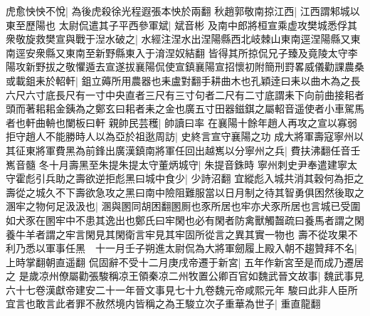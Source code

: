 虎愈怏怏不悅|{
	為後虎殺徐光程遐張本怏於兩翻}
秋趙郭敬南掠江西|{
	江西謂邾城以東至歷陽也}
太尉侃遣其子平西參軍斌|{
	斌音彬}
及南中郎將桓宣乘虚攻樊城悉俘其衆敬旋救樊宣與戰于湼水破之|{
	水經注涅水出涅陽縣西北岐棘山東南逕涅陽縣又東南逕安衆縣又東南至新野縣東入于淯涅奴結翻}
皆得其所掠侃兄子臻及竟陵太守李陽攻新野拔之敬懼遁去宣遂拔襄陽侃使宣鎮襄陽宣招懷初附簡刑罸畧威儀勸課農桑或載鉏耒於軺軒|{
	鉏立薅所用農器也耒盧對翻手耕曲木也孔穎逹曰耒以曲木為之長六尺六寸底長尺有一寸中央直者三尺有三寸句者二尺有二寸底謂耒下向前曲接耜者頭而著耜耜金銕為之鄭玄曰耜者耒之金也廣五寸田器鎡錤之屬軺音遥使者小車駕馬者也軒曲輈也闌板曰軒}
親帥民芸穫|{
	帥讀曰率}
在襄陽十餘年趙人再攻之宣以寡弱拒守趙人不能勝時人以為亞於祖逖周訪|{
	史終言宣守襄陽之功}
成大將軍壽寇寧州以其征東將軍費黑為前鋒出廣漢鎮南將軍任回出越嶲以分寧州之兵|{
	費扶沸翻任音壬嶲音髓}
冬十月壽黑至朱提朱提太守董炳城守|{
	朱提音銖時}
寧州刺史尹奉遣建寧太守霍彪引兵助之壽欲逆拒彪黑曰城中食少|{
	少詩沼翻}
宜縱彪入城共消其穀何為拒之壽從之城久不下壽欲急攻之黑曰南中險阻難服當以日月制之待其智勇俱困然後取之溷牢之物何足汲汲也|{
	溷與圂同胡困翻圂厠也豕所居也牢亦犬豕所居也言城已受圍如犬豕在圂牢中不患其逸出也鄭氏曰牢閑也必有閑者防禽獸觸齧疏曰養馬者謂之閑養牛羊者謂之牢言閑見其閑衛言牢見其牢固所從言之異其實一物也}
壽不從攻果不利乃悉以軍事任黑　十一月壬子朔進太尉侃為大將軍劒履上殿入朝不趨贊拜不名|{
	上時掌翻朝直遥翻}
侃固辭不受十二月庚戌帝遷于新宮|{
	五年作新宮至是而成乃遷居之}
是歲凉州僚屬勸張駿稱凉王領秦凉二州牧置公卿百官如魏武晉文故事|{
	魏武事見六十七卷漢獻帝建安二十一年晉文事見七十九卷魏元帝咸熙元年}
駿曰此非人臣所宜言也敢言此者罪不赦然境内皆稱之為王駿立次子重華為世子|{
	重直龍翻}


